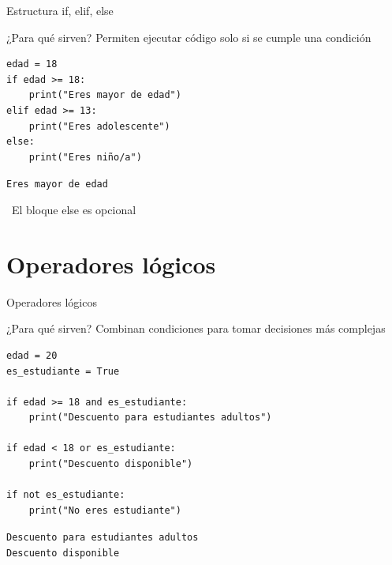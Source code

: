 \documentclass{beamer}
\begin{document}
\begin{frame}[fragile]{Estructura if, elif, else \ \faCodeBranch}
\begin{conceptbox}{¿Para qué sirven?}
Permiten ejecutar código solo si se cumple una condición
\end{conceptbox}

\begin{lstlisting}
edad = 18
if edad >= 18:
    print("Eres mayor de edad")
elif edad >= 13:
    print("Eres adolescente")
else:
    print("Eres niño/a")
\end{lstlisting}

\vspace{-0.2cm}
\begin{tcolorbox}[colback=green!10,colframe=green,title={\small\faArrowCircleRight \ Salida},coltitle=fg0,left=3pt,right=3pt,top=2pt,bottom=2pt,boxsep=1pt]
\small\texttt{Eres mayor de edad}
\end{tcolorbox}

\vspace{-0.1cm}
\begin{notebox}
\small\faExclamationTriangle \ El bloque else es opcional
\end{notebox}
\end{frame}

\section{Operadores lógicos}

\begin{frame}[fragile]{Operadores lógicos \ \faProjectDiagram}
\begin{conceptbox}{¿Para qué sirven?}
Combinan condiciones para tomar decisiones más complejas
\end{conceptbox}

\begin{lstlisting}
edad = 20
es_estudiante = True

if edad >= 18 and es_estudiante:
    print("Descuento para estudiantes adultos")

if edad < 18 or es_estudiante:
    print("Descuento disponible")

if not es_estudiante:
    print("No eres estudiante")
\end{lstlisting}

\vspace{-0.2cm}
\begin{tcolorbox}[colback=green!10,colframe=green,title={\small\faArrowCircleRight \ Salida},coltitle=fg0,left=3pt,right=3pt,top=2pt,bottom=2pt,boxsep=1pt]
\small\texttt{Descuento para estudiantes adultos\\
Descuento disponible}
\end{tcolorbox}
\end{frame}
\end{document}
